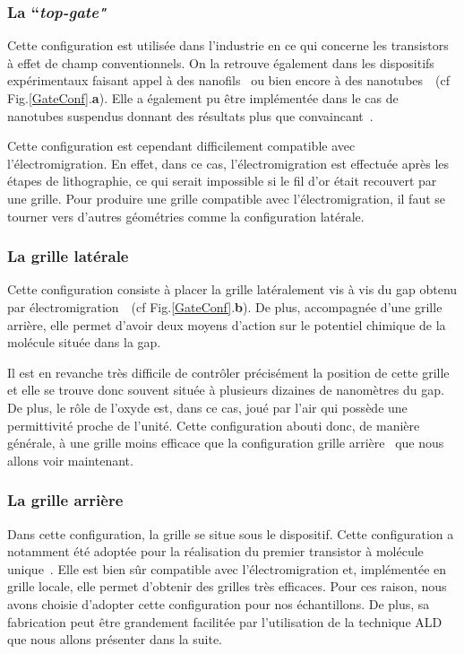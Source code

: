 \subsubsection{La ``\textit{top-gate"}}
Cette configuration est utilisée dans l'industrie en ce qui concerne les transistors à effet de champ conventionnels. On la retrouve également dans les dispositifs expérimentaux faisant appel à des nanofils~\cite{Fasth2005} ou bien encore à des nanotubes~\cite{Javey2002}~(cf Fig.\ref{GateConf}.\textbf{a}). Elle a également pu être implémentée dans le cas de nanotubes suspendus donnant des résultats plus que convaincant~\cite{Leturcq2009}.

Cette configuration est cependant difficilement compatible avec l'électromigration. En effet, dans ce cas, l'électromigration est effectuée après les étapes de lithographie, ce qui serait impossible si le fil d'or était recouvert par une grille. Pour produire une grille compatible avec l'électromigration, il faut se tourner vers d'autres géométries comme la configuration latérale.

\subsubsection{La grille latérale}
Cette configuration consiste à placer la grille latéralement vis à vis du gap obtenu par électromigration~\cite{Mangin2009}~(cf Fig.\ref{GateConf}.\textbf{b}). De plus, accompagnée d'une grille arrière, elle permet d'avoir deux moyens d'action sur le potentiel chimique de la molécule située dans la gap. 

Il est en revanche très difficile de contr\^oler précisément la position de cette grille et elle se trouve donc souvent située à plusieurs dizaines de nanomètres du gap. De plus, le r\^ole de l'oxyde est, dans ce cas, joué par l'air qui possède une permittivité proche de l'unité. Cette configuration abouti donc, de manière générale, à une grille moins efficace que la configuration grille arrière~\cite{Aurore2009} que nous allons voir maintenant.


\subsubsection{La grille arrière}
Dans cette configuration, la grille se situe sous le dispositif. Cette configuration a notamment été adoptée pour la réalisation du premier transistor à molécule unique~\cite{Park2000}. Elle est bien s\^ur compatible avec l'électromigration et, implémentée en grille locale, elle permet d'obtenir des grilles très efficaces. Pour ces raison, nous avons choisie d’adopter cette configuration pour nos échantillons. De plus, sa fabrication peut \^etre grandement facilitée par l'utilisation de la technique ALD que nous allons présenter dans la suite.


